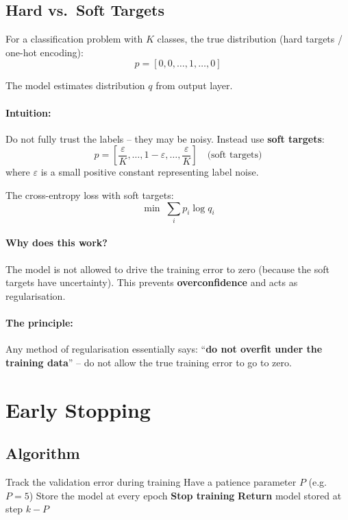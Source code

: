 \documentclass[12pt,a4paper]{article}
\begin{document}
\subsection{Hard vs.\ Soft Targets}

For a classification problem with $K$ classes, the true distribution (hard targets / one-hot encoding):
\[
  p = [0, 0, \ldots, 1, \ldots, 0]
\]

The model estimates distribution $q$ from output layer.

\paragraph{Intuition:} Do not fully trust the labels -- they may be noisy. Instead use \textbf{soft targets}:
\[
  p = \left[\frac{\varepsilon}{K}, \ldots, 1-\varepsilon, \ldots, \frac{\varepsilon}{K}\right]
  \quad\text{(soft targets)}
\]
where $\varepsilon$ is a small positive constant representing label noise.

The cross-entropy loss with soft targets:
\[
  \min\;\sum_i p_i \log q_i
\]

\paragraph{Why does this work?} The model is not allowed to drive the training error to zero (because the soft targets have uncertainty). This prevents \textbf{overconfidence} and acts as regularisation.

\paragraph{The principle:} Any method of regularisation essentially says: ``\textbf{do not overfit under the training data}'' -- do not allow the true training error to go to zero.

\section{Early Stopping}

\subsection{Algorithm}

\begin{algorithm}
\caption{Early Stopping}
\begin{algorithmic}[1]
\State Track the validation error during training
\State Have a patience parameter $P$ (e.g.\ $P = 5$)
\State Store the model at every epoch
  \State \textbf{Stop training}
  \State \textbf{Return} model stored at step $k - P$
\EndIf
\end{algorithmic}
\end{algorithm}
\end{document}

